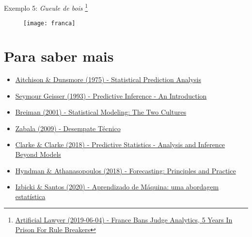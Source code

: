 \documentclass{beamer}
\newcommand\blfootnote[1]{%
  \begingroup
  \renewcommand\thefootnote{}\footnote{#1}%
  \addtocounter{footnote}{-1}%
  \endgroup
}
\begin{document}
\begin{frame}{Exemplo 5: \textit{Gueule de bois}}
\blfootnote{\tiny{\href{https://www.artificiallawyer.com/2019/06/04/france-bans-judge-analytics-5-years-in-prison-for-rule-breakers/}{Artificial Lawyer (2019-06-04) - France Bans Judge Analytics, 5 Years In Prison For Rule Breakers}}}
\begin{figure}
\texttt{[image: franca]}
\end{figure}
\end{frame}

\section{Para saber mais}
\begin{frame}{\secname}
    	\begin{itemize}
    	\item \href{https://doi.org/10.1017/CBO9780511569647}{Aitchison \& Dunsmore (1975) - Statistical Prediction Analysis}
    	\item \href{https://doi.org/10.1201/9780203742310}{Seymour Geisser (1993) - Predictive Inference - An Introduction}
    	\item \href{https://projecteuclid.org/euclid.ss/1009213726}{Breiman (2001) - Statistical Modeling: The Two Cultures}
    	\item \href{http://www.filipezabala.com/artigos/zabala2009desempate.pdf}{Zabala (2009) - Desempate Técnico}
    	\item \href{https://doi.org/10.1017/9781139236003}{Clarke \& Clarke (2018) - Predictive Statistics - Analysis and Inference Beyond Models}
    	\item \href{https://otexts.com/fpp2/}{Hyndman \& Athanasopoulos (2018) - Forecasting: Principles and Practice}
    	\item \href{http://www.rizbicki.ufscar.br/ame/}{Izbicki \& Santos (2020) - Aprendizado de Máquina: uma abordagem estatística}
	\end{itemize}
\end{frame}
\end{document}
